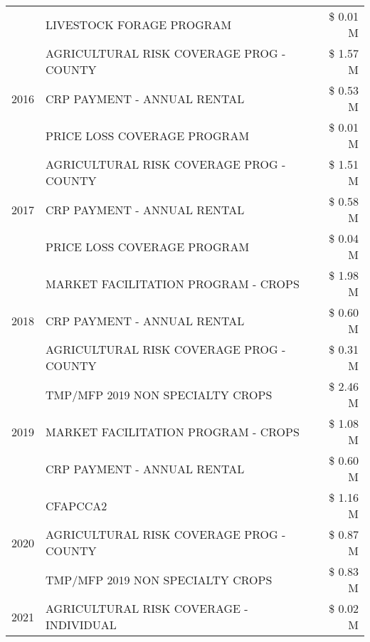 \begin{tabular}{llr}
 & LIVESTOCK FORAGE PROGRAM & \$ 0.01 M \\
\cline{1-3}
\multirow[t]{3}{*}{2016} & AGRICULTURAL RISK COVERAGE PROG - COUNTY      & \$ 1.57 M \\
 & CRP PAYMENT - ANNUAL RENTAL                   & \$ 0.53 M \\
 & PRICE LOSS COVERAGE PROGRAM                   & \$ 0.01 M \\
\cline{1-3}
\multirow[t]{3}{*}{2017} & AGRICULTURAL RISK COVERAGE PROG - COUNTY & \$ 1.51 M \\
 & CRP PAYMENT - ANNUAL RENTAL & \$ 0.58 M \\
 & PRICE LOSS COVERAGE PROGRAM & \$ 0.04 M \\
\cline{1-3}
\multirow[t]{3}{*}{2018} & MARKET FACILITATION PROGRAM - CROPS & \$ 1.98 M \\
 & CRP PAYMENT - ANNUAL RENTAL & \$ 0.60 M \\
 & AGRICULTURAL RISK COVERAGE PROG - COUNTY & \$ 0.31 M \\
\cline{1-3}
\multirow[t]{3}{*}{2019} & TMP/MFP 2019 NON SPECIALTY CROPS & \$ 2.46 M \\
 & MARKET FACILITATION PROGRAM - CROPS & \$ 1.08 M \\
 & CRP PAYMENT - ANNUAL RENTAL & \$ 0.60 M \\
\cline{1-3}
\multirow[t]{3}{*}{2020} & CFAPCCA2 & \$ 1.16 M \\
 & AGRICULTURAL RISK COVERAGE PROG - COUNTY & \$ 0.87 M \\
 & TMP/MFP 2019 NON SPECIALTY CROPS & \$ 0.83 M \\
\cline{1-3}
2021 & AGRICULTURAL RISK COVERAGE - INDIVIDUAL & \$ 0.02 M \\
\cline{1-3}
\bottomrule
\end{tabular}
